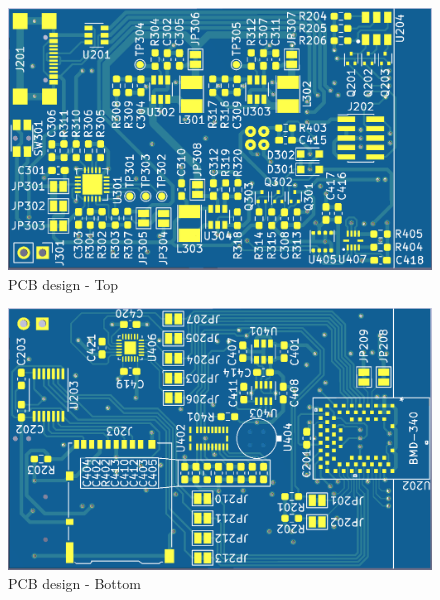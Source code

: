 \begin{figure}[!htb]
\centering
\includegraphics[width=0.9\paperwidth,keepaspectratio,angle=270]{images/Board_Top.png}
\caption{PCB design - Top}
\label{fig:board_top}
\end{figure}

\begin{figure}[!htb]
\centering
\includegraphics[width=0.9\paperwidth,keepaspectratio,angle=270]{images/Board_Bottom.png}
\caption{PCB design - Bottom}
\label{fig:board_bottom}
\end{figure}

